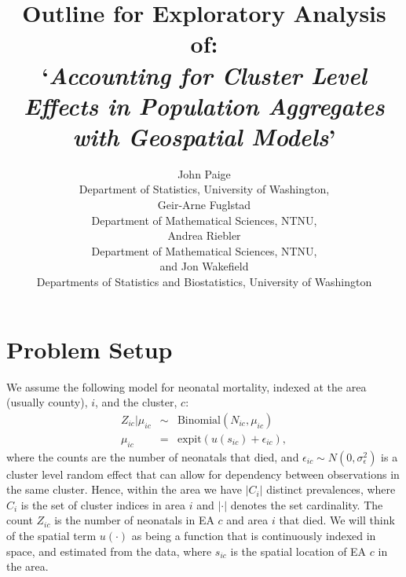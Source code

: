 \documentclass[12pt]{article}
\begin{document}
%

\def\spacingset#1{\renewcommand{\baselinestretch}%
{#1}\small\normalsize} \spacingset{1}




  \title{Outline for Exploratory Analysis of: \\`\textit{Accounting for Cluster Level Effects in Population Aggregates with Geospatial Models}'}
  \author{John Paige\\
    Department of Statistics, University of Washington,\\
    Geir-Arne Fuglstad \\
    Department of Mathematical Sciences, NTNU, \\
    Andrea Riebler \\
    Department of Mathematical Sciences, NTNU, \\
    and Jon Wakefield \\
    Departments of Statistics and Biostatistics, University of Washington}
  \maketitle

\bigskip

\noindent%
\vfill

\spacingset{1.5} %

\section{Problem Setup}

We assume the following model for neonatal mortality, indexed at the area (usually county), $i$, and the cluster, $c$:
\begin{eqnarray}
Z_{ic} | \mu_{ic}& \sim& \mbox{Binomial}(N_{ic}, \mu_{ic}) \label{eq:model1}\\
\mu_{ic} &=& \mbox{expit}(u(s_{ic}) + \epsilon_{ic}), \label{eq:model2}
\end{eqnarray}
where the counts are the number of neonatals that died, and $\epsilon_{ic} \sim N(0,\sigma_\epsilon^2)$ is a cluster level random effect that can allow for dependency between observations in the same cluster. Hence, within the area we have $|C_i|$ distinct prevalences, where $C_i$ is the set of cluster indices in area $i$ and $|\cdot|$ denotes the set cardinality. The count $Z_{ic}$ is the number of neonatals in EA $c$ and area $i$ that died. We will think of the spatial term $u(\cdot)$ as being a function that is continuously indexed in space, and estimated from the data, where $s_{ic}$ is the spatial location of EA $c$ in the area.
\end{document}
